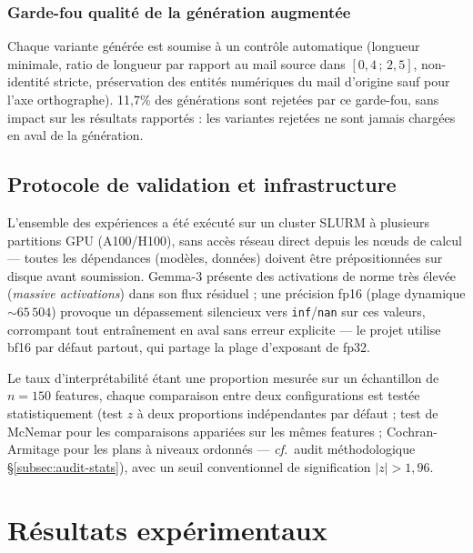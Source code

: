 \documentclass[11pt]{article}
\begin{document}
\subsubsection{Garde-fou qualité de la génération augmentée}
\label{subsec:augmentation}
Chaque variante générée est soumise à un contrôle automatique (longueur
minimale, ratio de longueur par rapport au mail source dans $[0{,}4\,;\,2{,}5]$,
non-identité stricte, préservation des entités numériques du mail d'origine
sauf pour l'axe orthographe). 11,7\% des générations sont rejetées par ce
garde-fou, sans impact sur les résultats rapportés : les variantes rejetées
ne sont jamais chargées en aval de la génération.

\subsection{Protocole de validation et infrastructure}

L'ensemble des expériences a été exécuté sur un cluster SLURM à plusieurs
partitions GPU (A100/H100), sans accès réseau direct depuis les nœuds de
calcul --- toutes les dépendances (modèles, données) doivent être
prépositionnées sur disque avant soumission. Gemma-3 présente des activations
de norme très élevée (\emph{massive activations}) dans son flux résiduel ; une
précision fp16 (plage dynamique $\sim 65\,504$) provoque un dépassement
silencieux vers \texttt{inf}/\texttt{nan} sur ces valeurs, corrompant tout
entraînement en aval sans erreur explicite --- le projet utilise bf16 par
défaut partout, qui partage la plage d'exposant de fp32.

Le taux d'interprétabilité étant une proportion mesurée sur un échantillon de
$n=150$ features, chaque comparaison entre deux configurations est testée
statistiquement (test $z$ à deux proportions indépendantes par défaut ; test de
McNemar pour les comparaisons appariées sur les mêmes features ;
Cochran-Armitage pour les plans à niveaux ordonnés --- \emph{cf.}~audit
méthodologique \S\ref{subsec:audit-stats}), avec un seuil conventionnel de
signification $|z| > 1{,}96$.

\newpage
\section{Résultats expérimentaux}
\label{sec:resultats}
\end{document}
